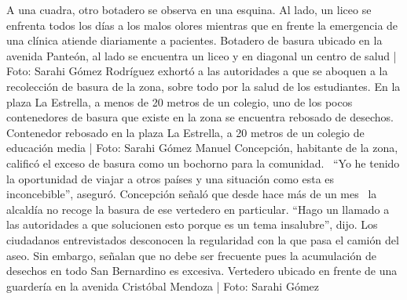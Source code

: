 \documentclass{article}%
\begin{document}
\newline%
%
A una cuadra, otro botadero se observa en una esquina. Al lado, un liceo se enfrenta todos los días a los malos olores mientras que en frente la emergencia de una clínica atiende diariamente a pacientes.%
\newline%
%
Botadero de basura ubicado en la avenida Panteón, al lado se encuentra un liceo y en diagonal un centro de salud | Foto: Sarahi Gómez%
\newline%
%
Rodríguez exhortó a las autoridades a que se aboquen a la recolección de basura de la zona, sobre todo por la salud de los estudiantes.%
\newline%
%
En la plaza La Estrella, a menos de 20 metros de un colegio, uno de los pocos contenedores de basura que existe en la zona se encuentra rebosado de desechos.%
\newline%
%
Contenedor rebosado en la plaza La Estrella, a 20 metros de un colegio de educación media | Foto: Sarahi Gómez%
\newline%
%
Manuel Concepción, habitante de la zona, calificó el exceso de basura como un bochorno para la comunidad.~ “Yo he tenido la oportunidad de viajar a otros países y una situación como esta es inconcebible”, aseguró.%
\newline%
%
Concepción señaló que desde hace más de un mes~ la alcaldía no recoge la basura de ese vertedero en particular.%
\newline%
%
“Hago un llamado a las autoridades a que solucionen esto porque es un tema insalubre”, dijo.%
\newline%
%
Los ciudadanos entrevistados desconocen la regularidad con la que pasa el camión del aseo. Sin embargo, señalan que no debe ser frecuente pues la acumulación de desechos en todo San Bernardino es excesiva.%
\newline%
%
Vertedero ubicado en frente de una guardería en la avenida Cristóbal Mendoza | Foto: Sarahi Gómez%
\newline%
%
\end{document}
